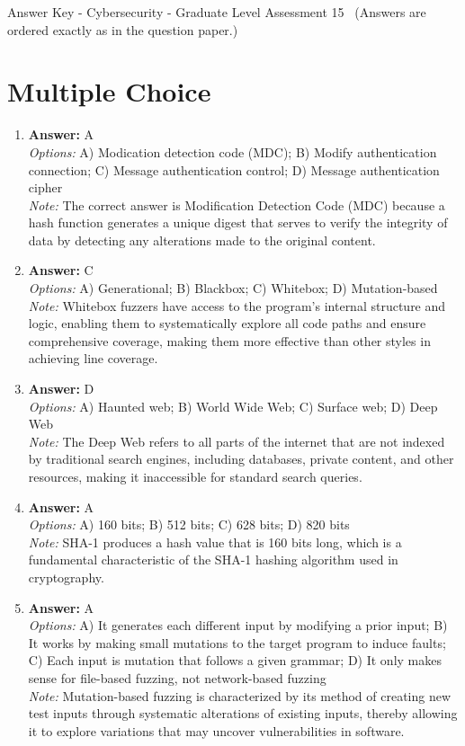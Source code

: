 \documentclass[12pt]{article}
\begin{document}
\begin{center}
Answer Key - Cybersecurity - Graduate Level Assessment 15 \
\small (Answers are ordered exactly as in the question paper.)
\end{center}

\section*{Multiple Choice}
\begin{enumerate}[label=\arabic*.]
\item \textbf{Answer:} A
\\ \textit{Options:} A) Modication detection code (MDC); B) Modify authentication connection; C) Message authentication control; D) Message authentication cipher
\\ \textit{Note:} The correct answer is Modification Detection Code (MDC) because a hash function generates a unique digest that serves to verify the integrity of data by detecting any alterations made to the original content.
\item \textbf{Answer:} C
\\ \textit{Options:} A) Generational; B) Blackbox; C) Whitebox; D) Mutation-based
\\ \textit{Note:} Whitebox fuzzers have access to the program's internal structure and logic, enabling them to systematically explore all code paths and ensure comprehensive coverage, making them more effective than other styles in achieving line coverage.
\item \textbf{Answer:} D
\\ \textit{Options:} A) Haunted web; B) World Wide Web; C) Surface web; D) Deep Web
\\ \textit{Note:} The Deep Web refers to all parts of the internet that are not indexed by traditional search engines, including databases, private content, and other resources, making it inaccessible for standard search queries.
\item \textbf{Answer:} A
\\ \textit{Options:} A) 160 bits; B) 512 bits; C) 628 bits; D) 820 bits
\\ \textit{Note:} SHA-1 produces a hash value that is 160 bits long, which is a fundamental characteristic of the SHA-1 hashing algorithm used in cryptography.
\item \textbf{Answer:} A
\\ \textit{Options:} A) It generates each different input by modifying a prior input; B) It works by making small mutations to the target program to induce faults; C) Each input is mutation that follows a given grammar; D) It only makes sense for file-based fuzzing, not network-based fuzzing
\\ \textit{Note:} Mutation-based fuzzing is characterized by its method of creating new test inputs through systematic alterations of existing inputs, thereby allowing it to explore variations that may uncover vulnerabilities in software.
\end{enumerate}
\end{document}

